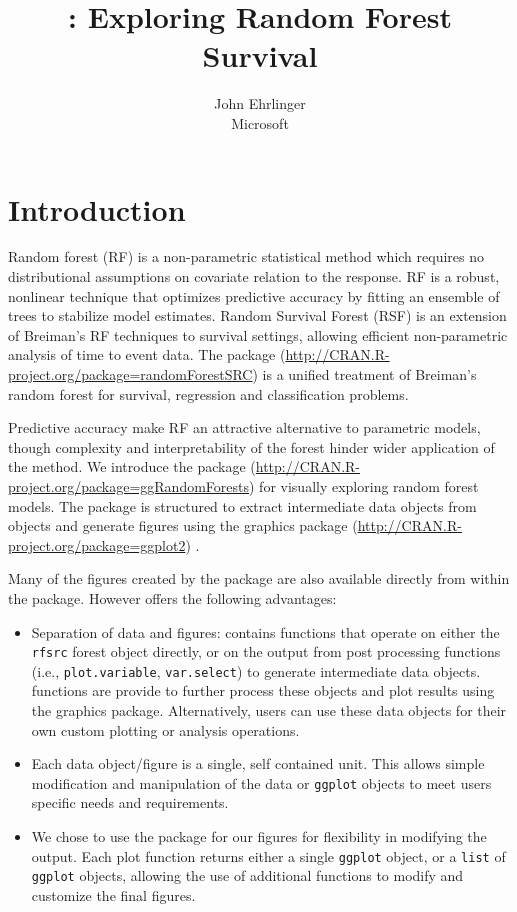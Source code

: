 \documentclass[article, nojss]{jss}
\author{
John Ehrlinger\\Microsoft
}
\title{\pkg{ggRandomForests}: Exploring Random Forest Survival}
\begin{document}
\section{Introduction}\label{introduction}

Random forest \citep{Breiman:2001} (RF) is a non-parametric statistical
method which requires no distributional assumptions on covariate
relation to the response. RF is a robust, nonlinear technique that
optimizes predictive accuracy by fitting an ensemble of trees to
stabilize model estimates. Random Survival Forest (RSF)
\citep{Ishwaran:2007a, Ishwaran:2008} is an extension of Breiman's RF
techniques to survival settings, allowing efficient non-parametric
analysis of time to event data. The  package
(\url{http://CRAN.R-project.org/package=randomForestSRC})
\citep{Ishwaran:RFSRC:2014} is a unified treatment of Breiman's random
forest for survival, regression and classification problems.

Predictive accuracy make RF an attractive alternative to parametric
models, though complexity and interpretability of the forest hinder
wider application of the method. We introduce the 
package (\url{http://CRAN.R-project.org/package=ggRandomForests}) for
visually exploring random forest models. The 
package is structured to extract intermediate data objects from
 objects and generate figures using the
 graphics package
(\url{http://CRAN.R-project.org/package=ggplot2}) \citep{Wickham:2009}.

Many of the figures created by the  package are
also available directly from within the  package.
However  offers the following advantages:

\begin{itemize}
\item
  Separation of data and figures:  contains
  functions that operate on either the \texttt{rfsrc} forest object
  directly, or on the output from  post processing
  functions (i.e., \texttt{plot.variable}, \texttt{var.select}) to
  generate intermediate  data objects.
   functions are provide to further process these
  objects and plot results using the  graphics package.
  Alternatively, users can use these data objects for their own custom
  plotting or analysis operations.
\item
  Each data object/figure is a single, self contained unit. This allows
  simple modification and manipulation of the data or \texttt{ggplot}
  objects to meet users specific needs and requirements.
\item
  We chose to use the  package for our figures for
  flexibility in modifying the output. Each  plot
  function returns either a single \texttt{ggplot} object, or a
  \texttt{list} of \texttt{ggplot} objects, allowing the use of
  additional  functions to modify and customize the final
  figures.
\end{itemize}
\end{document}
